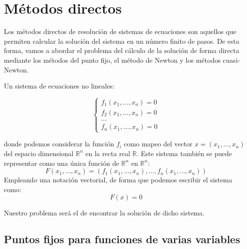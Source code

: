 	

	

\chapter{Métodos directos}


Los métodos directos de resolución de sistemas de ecuaciones son aquellos que permiten calcular la solución del sistema en un número finito de pasos. De esta forma, vamos a abordar el problema del cálculo de la solución de forma directa mediante los métodos del punto fijo, el método de Newton y los métodos cuasi-Newton.

Un sistema de ecuaciones no lineales:

$$\begin{cases}
	f_1(x_1,\dots,x_n)  = 0 \\
	f_2(x_1,\dots,x_n)  = 0 \nonumber \\
	...                   \nonumber \\
	f_n(x_1,\dots,x_n)  = 0 \nonumber
\end{cases}$$

donde podemos considerar la función $f_i$ como mapeo del vector $x = (x_1,\dots,x_n)$ del espacio dimensional $\mathbb{R}^n$ en la recta real $\mathbb{R}$. Este sistema también se puede representar como una única función de $\mathbb{R}^n$ en $\mathbb{R}^n$:
\[F(x_1,\dots,x_n) = (f_1(x_1,\dots,x_n),\dots,f_n(x_1,\dots,x_n))\]
Empleando una notación vectorial, de forma que podemos escribir el sistema como:
\[F(x) = 0\]

Nuestro problema será el de encontrar la solución de dicho sistema. 
\section{Puntos fijos para funciones de varias variables}

